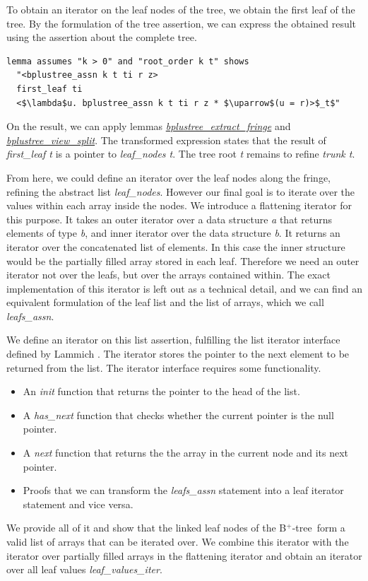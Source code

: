 \documentclass[a4paper,UKenglish,cleveref, autoref, thm-restate]{lipics-v2021}
\newcommand{\btree}{B$^+$-tree}
\begin{document}
To obtain an iterator on the leaf nodes of the tree,
we obtain the first leaf of the tree.
By the formulation of the tree assertion, we can express
the obtained result using the assertion about the complete tree.

\begin{lstlisting}[mathescape=true, language=Isabelle,label=lst:btree-first-leaf]
lemma assumes "k > 0" and "root_order k t" shows
  "<bplustree_assn k t ti r z>
  first_leaf ti
  <$\lambda$u. bplustree_assn k t ti r z * $\uparrow$(u = r)>$_t$"
\end{lstlisting}

On the result, we can apply lemmas \hyperref[lst:btree-extract-fringe]{\emph{bplustree\_extract\_fringe}} 
and \hyperref[lst:btree-view-split]{\emph{bplustree\_view\_split}}.
The transformed expression states that
the result of \emph{first\_leaf t} is a pointer to \emph{leaf\_nodes t}.
The tree root \emph{t} remains to refine \emph{trunk t}.

From here, we could define an iterator over the leaf nodes
along the fringe, refining the abstract list \emph{leaf\_nodes}.
However our final goal is to iterate over the values within each array inside the nodes.
We introduce a flattening iterator for this purpose.
It takes an outer iterator over a data structure \textit{a} that returns elements of type \textit{b},
and inner iterator over the data structure \textit{b}.
It returns an iterator over the concatenated list of elements.
In this case the inner structure would be the partially filled array
stored in each leaf.
Therefore we need an outer iterator not over the leafs, but over the arrays
contained within.
The exact implementation of this iterator is left out as a technical detail,
and we can find an equivalent formulation of the leaf list and the list of arrays,
which we call \emph{leafs\_assn}.

We define an iterator on this list assertion,
fulfilling the list iterator interface defined by Lammich \cite{DBLP:conf/itp/Lammich19}.
The iterator stores the pointer to the next element to be returned from the list.
The iterator interface requires some functionality.
\begin{itemize}
    \item An \emph{init} function that returns the pointer to the head of the list.
    \item A \emph{has\_next} function that checks whether the current pointer is the null pointer.
    \item A \emph{next} function that returns the the array in the current node and its next pointer.
    \item Proofs that we can transform the \emph{leafs\_assn} statement into 
          a leaf iterator statement and vice versa.
\end{itemize}
We provide all of it and show that the linked leaf nodes of the \btree\ form a valid
list of arrays that can be iterated over.
We combine this iterator with the iterator over partially filled arrays
in the flattening iterator and obtain an iterator over all leaf values \emph{leaf\_values\_iter}.
\end{document}
